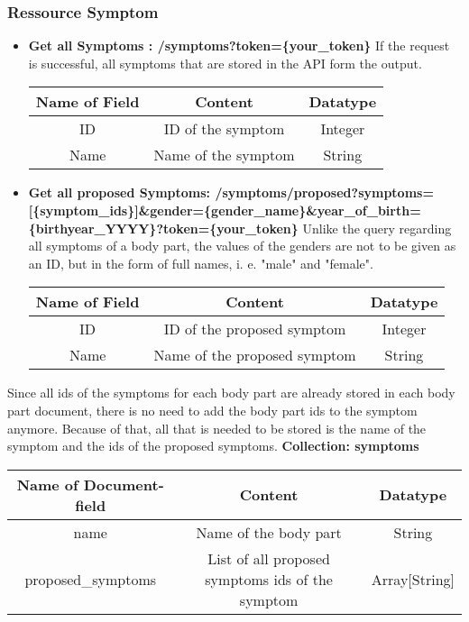\subsubsection{Ressource Symptom}
\begin{itemize}
		\item \textbf{Get all Symptoms :  /symptoms?token=\{your\_token\}}
\newline		
If the request is successful, all symptoms that are stored in the API form the output.
		\begin{center}
			\begin{tabular}{ | c| c| c | } 
  				\hline
  				Name of Field& Content & Datatype \\ 
  				\hline
  				ID & ID of the symptom & Integer \\ 
  				\hline
 				Name & Name of the symptom & String \\ 
  				\hline
			\end{tabular}
		\end{center}

\item \textbf{Get all proposed Symptoms:  /symptoms/proposed?symptoms=[\{symptom\_ids\}]\newline\&gender=\{gender\_name\}\&year\_of\_birth=\{birthyear\_YYYY\}?token=\{your\_token\}}
\newline
Unlike the query regarding all symptoms of a body part, the values of the genders are not to be given as an ID, but in the form of full names, i. e. "male" and "female".
	\begin{center}
			\begin{tabular}{ | c| c| c | } 
  				\hline
  				Name of Field& Content & Datatype \\ 
  				\hline
  				ID & ID of the proposed symptom & Integer \\ 
  				\hline
 				Name & Name of the proposed symptom & String \\ 
  				\hline
			\end{tabular}
		\end{center}
\end{itemize}
Since all ids of the symptoms for each body part are already stored in each body part document, there is no need to add the body part ids to the symptom anymore. Because of that, all that is needed to be stored is the name of the symptom and the ids of the proposed symptoms.
\newline
\textbf{Collection: symptoms}
		\begin{center}
			\begin{tabular}{ | c| c| c | } 
  				\hline
  				Name of Document-field& Content & Datatype \\ 
  				\hline
  				name & Name of the body part & String \\ 
  				\hline
 				proposed\_symptoms & List of all proposed symptoms ids of the symptom  & Array[String] \\ 
  				\hline
			\end{tabular}
		\end{center}
